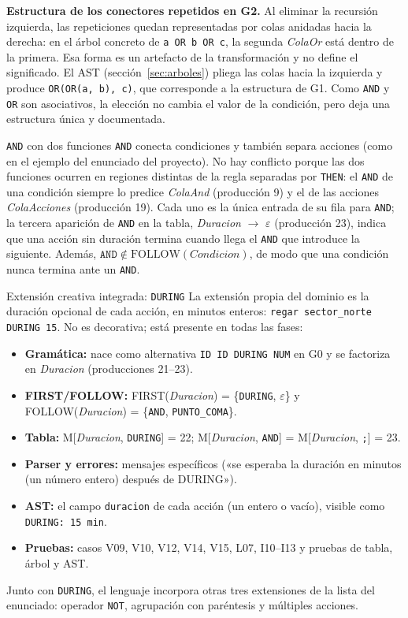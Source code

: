 \documentclass[11pt,letterpaper]{article}
\makeatletter
\renewcommand\subsection{\@startsection{subsection}{2}{\z@}{-2.6ex\@plus -1ex \@minus -.2ex}{1.0ex \@plus .2ex}%
  {\normalfont\large\bfseries}}
\newcommand{\T}[1]{\texttt{#1}}
\newcommand{\NT}[1]{\textit{#1}}
\newcommand{\eps}{\ensuremath{\varepsilon}}
\makeatother
\begin{document}
\textbf{Estructura de los conectores repetidos en G2.} Al eliminar la recursión izquierda, las repeticiones
quedan representadas por colas anidadas hacia la derecha: en el árbol concreto de \T{a OR b OR c}, la segunda
\NT{ColaOr} está dentro de la primera. Esa forma es un artefacto de la transformación y no define el
significado. El AST (sección~\ref{sec:arboles}) pliega las colas hacia la izquierda y produce
\T{OR(OR(a, b), c)}, que corresponde a la estructura de G1. Como \T{AND} y \T{OR} son asociativos, la elección no
cambia el valor de la condición, pero deja una estructura única y documentada.

\subsection{\T{AND} con dos funciones}\label{sec:and}
\T{AND} conecta condiciones y también separa acciones (como en el ejemplo del enunciado del proyecto). No hay
conflicto porque las dos funciones ocurren en regiones distintas de la regla separadas por \T{THEN}: el
\T{AND} de una condición siempre lo predice \NT{ColaAnd} (producción 9) y el de las acciones \NT{ColaAcciones}
(producción 19). Cada uno es la única entrada de su fila para \T{AND}; la tercera aparición de \T{AND} en la
tabla, \NT{Duracion} $\to$ \eps{} (producción 23), indica que una acción sin duración termina cuando llega
el \T{AND} que introduce la siguiente. Además, $\T{AND} \notin \mathrm{FOLLOW}(\NT{Condicion})$, de modo que
una condición nunca termina ante un \T{AND}.

\subsection{Extensión creativa integrada: \T{DURING}}\label{sec:during}
La extensión propia del dominio es la duración opcional de cada acción, en minutos enteros:
\T{regar sector\_norte DURING 15}. No es decorativa; está presente en todas las fases:
\begin{itemize}
\item \textbf{Gramática:} nace como alternativa \T{ID ID DURING NUM} en G0 y se factoriza en \NT{Duracion}
(producciones 21--23).
\item \textbf{FIRST/FOLLOW:} FIRST(\NT{Duracion}) = \{\T{DURING}, \eps\} y
FOLLOW(\NT{Duracion}) = \{\T{AND}, \T{PUNTO\_COMA}\}.
\item \textbf{Tabla:} M[\NT{Duracion}, \T{DURING}] = 22; M[\NT{Duracion}, \T{AND}] = M[\NT{Duracion}, \T{;}] = 23.
\item \textbf{Parser y errores:} mensajes específicos («se esperaba la duración en minutos (un número entero)
después de DURING»).
\item \textbf{AST:} el campo \T{duracion} de cada acción (un entero o vacío), visible como \T{DURING: 15 min}.
\item \textbf{Pruebas:} casos V09, V10, V12, V14, V15, L07, I10--I13 y pruebas de tabla, árbol y AST.
\end{itemize}
Junto con \T{DURING}, el lenguaje incorpora otras tres extensiones de la lista del enunciado: operador
\T{NOT}, agrupación con paréntesis y múltiples acciones.
\end{document}
